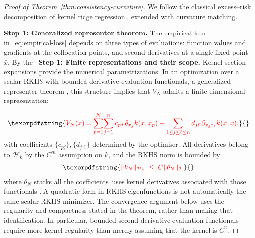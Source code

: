 \documentclass[11pt]{article}
\theoremstyle{plain}      %
\theoremstyle{definition} %
\providecommand{\DIFaddtex}[1]{{\protect\color{blue}#1}} %
\providecommand{\DIFdeltex}[1]{{\protect\color{red}#1}} %
\providecommand{\DIFaddbegin}{} %
\providecommand{\DIFaddend}{} %
\providecommand{\DIFdelbegin}{} %
\providecommand{\DIFdelend}{} %
\providecommand{\DIFadd}[1]{\texorpdfstring{\DIFaddtex{#1}}{#1}} %
\providecommand{\DIFdel}[1]{\texorpdfstring{\DIFdeltex{#1}}{}} %
\newcommand{\DIFscaledelfig}{1.0}
\newlength{\DIFdelgraphicswidth} %
\newlength{\DIFdelgraphicsheight} %
\newcommand{\DIFaddincludegraphics}[2][]{{\color{blue}\fbox{\DIFOincludegraphics[#1]{#2}}}} %
\newcommand{\DIFdelincludegraphics}[2][]{%
\sbox{\DIFdelgraphicsbox}{\DIFOincludegraphics[#1]{#2}}%
\settoboxwidth{\DIFdelgraphicswidth}{\DIFdelgraphicsbox} %
\settoboxtotalheight{\DIFdelgraphicsheight}{\DIFdelgraphicsbox} %
\scalebox{\DIFscaledelfig}{%
\parbox[b]{\DIFdelgraphicswidth}{\usebox{\DIFdelgraphicsbox}\\[-\baselineskip] \rule{\DIFdelgraphicswidth}{0em}}\llap{\resizebox{\DIFdelgraphicswidth}{\DIFdelgraphicsheight}{%
\setlength{\unitlength}{\DIFdelgraphicswidth}%
\begin{picture}(1,1)%
\thicklines\linethickness{2pt} %
{\color[rgb]{1,0,0}\put(0,0){\framebox(1,1){}}}%
{\color[rgb]{1,0,0}\put(0,0){\line( 1,1){1}}}%
{\color[rgb]{1,0,0}\put(0,1){\line(1,-1){1}}}%
\end{picture}%
}\hspace*{3pt}}} %
} %
\DeclareRobustCommand{\DIFaddbegin}{\DIFOaddbegin \let\includegraphics\DIFaddincludegraphics} %
\DeclareRobustCommand{\DIFaddend}{\DIFOaddend \let\includegraphics\DIFOincludegraphics} %
\DeclareRobustCommand{\DIFdelbegin}{\DIFOdelbegin \let\includegraphics\DIFdelincludegraphics} %
\DeclareRobustCommand{\DIFdelend}{\DIFOaddend \let\includegraphics\DIFOincludegraphics} %
\begin{document}
\begin{proof}[Proof of Theorem~\ref{thm:consistency-curvature}]
\DIFdelbegin \DIFdel{We follow the classical excess–risk decomposition of kernel ridge regression \cite{CaponnettoDeVito2007,SteinwartChristmann2008}, extended with curvature matching. }%

\DIFdel{\textbf{Step 1: Generalized representer theorem.}
The empirical loss in~\eqref{eq:empirical-loss} depends on three types of evaluations:
function values and gradients at the collocation points, and second derivatives at a single fixed point $\bar x$.
By the }\DIFdelend\ \DIFaddbegin \DIFadd{\textbf{Step 1: Finite representations and their scope.}
Kernel section expansions provide the numerical parametrizations. In an optimization over a scalar RKHS with bounded derivative evaluation functionals, a }\DIFaddend generalized representer theorem \DIFdelbegin \DIFdel{, this structure implies that $V_N$ admits a finite-dimensional representation:
}%

\[
  \DIFdel{V_{N}(x)
  = \sum_{p=1}^{N}\!\sum_{j=1}^{n}
        c_{pj}\,\partial_{x_{j}}k(x,x_{p})
    + \sum_{1\le j\le\ell\le n}
        d_{j\ell}\,\partial_{x_{j}x_{\ell}}k(x,\bar x),
}\]%
\DIFdel{with coefficients $\{c_{pj}\},\{d_{j\ell}\}$ determined by the optimiser. All derivatives belong to $\mathcal H_{k}$ by the $C^m$ assumption on $k$, and the RKHS norm is bounded by
}\[
  \DIFdel{\|V_{N}\|_{\mathcal H_{k}}
  \;\le\;
  C\|\theta_{N}\|_2,
}\]%
\DIFdel{where $\theta_{N}$ stacks all the coefficients}\DIFdelend\ \DIFaddbegin \DIFadd{uses kernel derivatives associated with those functionals \cite{Chen2021}. A quadratic form in RKHS eigenfunctions is not automatically the same scalar RKHS minimizer. The convergence argument below uses the regularity and compactness stated in the theorem, rather than making that identification. In particular, bounded second-derivative evaluation functionals require more kernel regularity than merely assuming that the kernel is $C^2$}\DIFaddend .


\end{proof}
\end{document}
